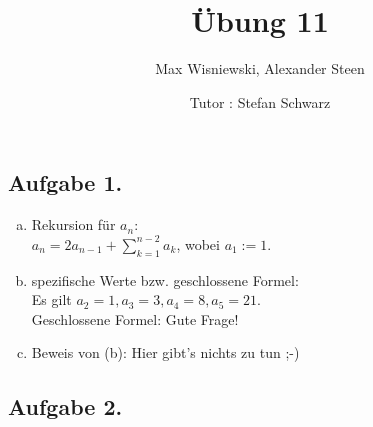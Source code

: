 \documentclass[11pt,a4paper,ngerman]{article}
\date{Tutor : Stefan Schwarz}
\title{Übung 11}
\author{Max Wisniewski, Alexander Steen}
\begin{document}

\renewcommand{\figurename}{Figure}

\maketitle
\thispagestyle{fancy}

\subsection*{Aufgabe 1.}
\begin{enumerate}[a)]
\item Rekursion für $a_n$: \\
$a_n = 2 a_{n-1} + \sum_{k=1}^{n-2} a_k$, wobei $a_1 := 1$.
\item spezifische Werte bzw. geschlossene Formel: \\
Es gilt $a_2 = 1, a_3 = 3, a_4 = 8, a_5 = 21$. \\
Geschlossene Formel: Gute Frage!
\item Beweis von (b): Hier gibt's nichts zu tun ;-)\\
\end{enumerate}

\subsection*{Aufgabe 2.}
\end{document}
